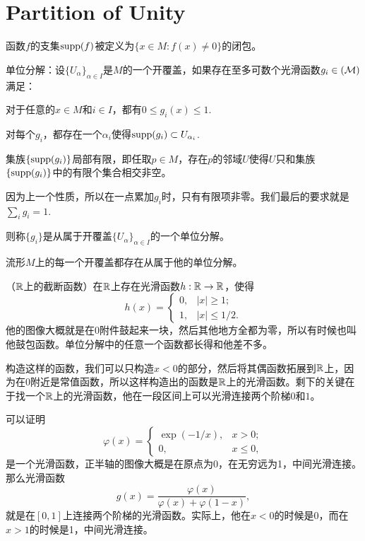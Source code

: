 \chapter{Partition of Unity}

函数$f$的支集$\operatorname{supp}(f)$被定义为$\{x\in M:f(x)\neq 0\}$的闭包。

\para \label{POUdef} 单位分解：设$\{U_\alpha\}_{\alpha\in I}$是$M$的一个开覆盖，如果存在至多可数个光滑函数$g_i\in \cal(M)$满足：

 对于任意的$x\in M$和$i\in I$，都有$0\leq g_i(x)\leq 1$.

 对每个$g_i$，都存在一个${\alpha_i}$使得$\operatorname{supp}(g_i)\subset U_{\alpha_i}$.

 集族$\{\operatorname{supp}(g_i)\}$局部有限，即任取$p\in M$，存在$p$的邻域$U$使得$U$只和集族$\{\operatorname{supp}(g_i)\}$中的有限个集合相交非空。

 因为上一个性质，所以在一点累加$g_i$时，只有有限项非零。我们最后的要求就是$\sum_i g_i=1$.

则称$\{g_i\}$是从属于开覆盖$\{U_\alpha\}_{\alpha\in I}$的一个单位分解。

\lem \label{POU}流形$M$上的每一个开覆盖都存在从属于他的单位分解。

\para （$\mathbb{R}$上的截断函数）在$\mathbb{R}$上存在光滑函数$h:\mathbb{R}\to\mathbb{R}$，使得
\[
	h(x)=
		\begin{cases}
		0,&|x|\geq 1;\\
		1,&|x|\leq 1/2.
		\end{cases}
\]
他的图像大概就是在$0$附件鼓起来一块，然后其他地方全都为零，所以有时候也叫他鼓包函数。单位分解中的任意一个函数都长得和他差不多。

构造这样的函数，我们可以只构造$x<0$的部分，然后将其偶函数拓展到$\mathbb{R}$上，因为在$0$附近是常值函数，所以这样构造出的函数是$\mathbb{R}$上的光滑函数。剩下的关键在于找一个$\mathbb{R}$上的光滑函数，他在一段区间上可以光滑连接两个阶梯$0$和$1$。

可以证明
\[
	\varphi(x)=
		\begin{cases}
			\exp(-1/x),&x> 0;\\
			0,&x\leq 0,
		\end{cases}
\]
是一个光滑函数，正半轴的图像大概是在原点为0，在无穷远为1，中间光滑连接。那么光滑函数
\[
	g(x)=\frac{\varphi(x)}{\varphi(x)+\varphi(1-x)},
\]
就是在$[0,1]$上连接两个阶梯的光滑函数。实际上，他在$x<0$的时候是0，而在$x>1$的时候是1，中间光滑连接。

